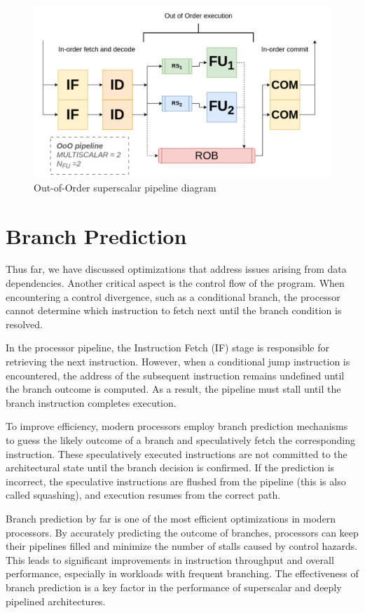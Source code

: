 \begin{figure}[H]
    \centering
    \includegraphics[width=0.6 \textwidth]{figures/ooo-pipeline.png}
    \caption{Out-of-Order superscalar pipeline diagram}
    \label{fig:ooo-pipeline}
\end{figure}

\section{Branch Prediction}

Thus far, we have discussed optimizations that address issues arising from data dependencies. Another critical aspect is the control flow of the program. When encountering a control divergence, such as a conditional branch, the processor cannot determine which instruction to fetch next until the branch condition is resolved.

In the processor pipeline, the Instruction Fetch (IF) stage is responsible for retrieving the next instruction. However, when a conditional jump instruction is encountered, the address of the subsequent instruction remains undefined until the branch outcome is computed. As a result, the pipeline must stall until the branch instruction completes execution.

To improve efficiency, modern processors employ branch prediction mechanisms to guess the likely outcome of a branch and speculatively fetch the corresponding instruction. These speculatively executed instructions are not committed to the architectural state until the branch decision is confirmed. If the prediction is incorrect, the speculative instructions are flushed from the pipeline (this is also called squashing), and execution resumes from the correct path.

Branch prediction by far is one of the most efficient optimizations in modern processors. By accurately predicting the outcome of branches, processors can keep their pipelines filled and minimize the number of stalls caused by control hazards. This leads to significant improvements in instruction throughput and overall performance, especially in workloads with frequent branching. The effectiveness of branch prediction is a key factor in the performance of superscalar and deeply pipelined architectures.

